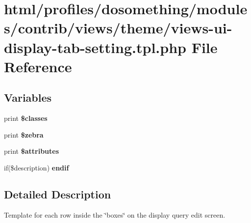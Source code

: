 \hypertarget{views-ui-display-tab-setting_8tpl_8php}{
\section{html/profiles/dosomething/modules/contrib/views/theme/views-\/ui-\/display-\/tab-\/setting.tpl.php File Reference}
\label{views-ui-display-tab-setting_8tpl_8php}
}
\subsection*{Variables}
\begin{DoxyCompactItemize}
\item 
\hypertarget{views-ui-display-tab-setting_8tpl_8php_a6d48ecbdbc70ca1812e665169b5fa1e2}{
print {\bfseries \$classes}}
\label{views-ui-display-tab-setting_8tpl_8php_a6d48ecbdbc70ca1812e665169b5fa1e2}

\item 
\hypertarget{views-ui-display-tab-setting_8tpl_8php_a5b3d27710f5aaf2d7881d9179fec2a8a}{
print {\bfseries \$zebra}}
\label{views-ui-display-tab-setting_8tpl_8php_a5b3d27710f5aaf2d7881d9179fec2a8a}

\item 
\hypertarget{views-ui-display-tab-setting_8tpl_8php_a9c88c4272fa40546577b45392a0b3cd3}{
print {\bfseries \$attributes}}
\label{views-ui-display-tab-setting_8tpl_8php_a9c88c4272fa40546577b45392a0b3cd3}

\item 
\hypertarget{views-ui-display-tab-setting_8tpl_8php_a2f4b2cb8fdee9794f54e342161f6a415}{
if(\$description) {\bfseries endif}}
\label{views-ui-display-tab-setting_8tpl_8php_a2f4b2cb8fdee9794f54e342161f6a415}

\end{DoxyCompactItemize}


\subsection{Detailed Description}
Template for each row inside the \char`\"{}boxes\char`\"{} on the display query edit screen. 